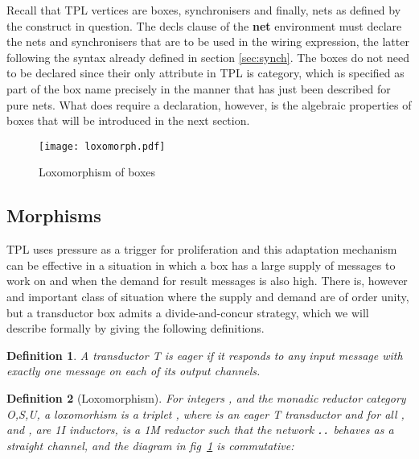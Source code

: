 \documentclass[11pt]{report}
\newtheorem*{mydef}{Definition}
\begin{document}
Recall that TPL vertices are boxes, synchronisers and finally, nets as defined by the construct in question. The decls clause of the {\bf net}
environment must declare the nets and synchronisers that are to be used in the wiring expression, the latter following the syntax already defined in section \ref{sec:synch}. The boxes do not need to be declared since their only attribute
in TPL is category, which is specified as part of the box name precisely in the manner that has just been described for pure nets. 
What does require a declaration, however, is the algebraic properties
of boxes that will be introduced in the next section.

\begin{figure}
\texttt{[image: loxomorph.pdf]}\\
\vspace{-2.5in}
\caption{Loxomorphism of boxes
\label{fig:loxo}}
\end{figure}
\subsection{Morphisms}
TPL uses pressure as a trigger for proliferation and this adaptation mechanism can be effective in a situation in which a box has a large supply of messages
to work on and when the demand for result messages is also high. There is, however and important class of situation where the supply and demand are of order unity,
but a transductor box admits a divide-and-concur strategy, which we will describe formally by giving the following definitions.
\begin{mydef}
A transductor {\rm T} is {\it eager} if it responds to any input message with exactly one message on each of its  output channels.
\end{mydef}
\begin{mydef}[Loxomorphism]
For integers ,  and the monadic reductor category {\rm O,S,U}, a loxomorhism  is a triplet , where
 is an eager {\rm T} transductor and
for all ,  and , are {\rm 1I} inductors,  is a {\rm 1M} reductor such that the network {\tt .\kern-3pt.} behaves
as a straight channel,  and the diagram in fig~\ref{fig:loxo} is commutative:

\end{mydef}
\end{document}
